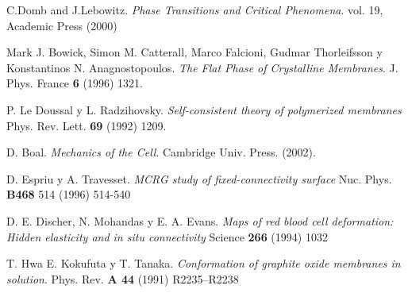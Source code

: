 \begin{thebibliography}{99}









C.Domb and J.Lebowitz.
\textit{Phase Transitions and Critical Phenomena}.
vol. 19, Academic Press (2000)

 Mark J. Bowick, Simon M. Catterall, Marco
  Falcioni, Gudmar Thorleifsson y Konstantinos N. Anagnostopoulos. 
  \textit{The Flat Phase of Crystalline Membranes}. 
  J. Phys. France \textbf{6} (1996) 1321.

P. Le Doussal y L. Radzihovsky.
  \textit{Self-consistent theory of polymerized membranes}
  Phys. Rev. Lett. \textbf{69} (1992) 1209.

  D. Boal. 
  \textit{Mechanics of the Cell}.  
  Cambridge Univ. Press. (2002).

D. Espriu y A. Travesset.
  \textit{MCRG study of fixed-connectivity surface}
  Nuc. Phys. \textbf{B468} 514 (1996) 514-540 

 D. E. Discher, N. Mohandas y E. A. Evans.
\textit{Maps of red blood cell deformation: Hidden elasticity and in situ connectivity}
  Science \textbf{266} (1994) 1032

T. Hwa E. Kokufuta y T. Tanaka. 
  \textit{Conformation of graphite oxide membranes in solution}.
  Phys. Rev. \textbf{A 44} (1991) R2235–R2238  


\end{thebibliography}

